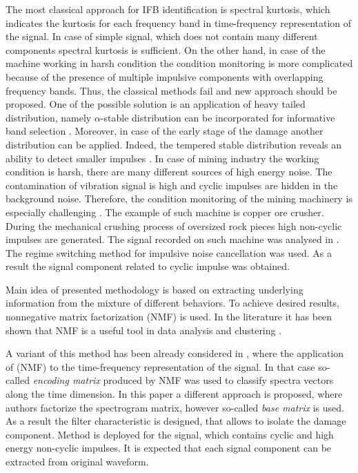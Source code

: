 \documentclass[journal]{IEEEtran}
\begin{document}
The most classical approach for IFB identification is spectral kurtosis, which indicates the kurtosis for each frequency band in time-frequency representation of the signal. In case of simple signal, which does not contain many different components spectral kurtosis is sufficient. On the other hand, in case of the machine working in harsh condition the condition monitoring is more complicated because of the presence of multiple impulsive components with overlapping frequency bands. Thus, the classical methods fail and new approach should be proposed. One of the possible solution is an application of heavy tailed distribution, namely $\alpha$-stable distribution can be incorporated for informative band selection \cite{zak2016data}. Moreover, in case of the early stage of the damage another distribution can be applied. Indeed, the tempered stable distribution reveals an ability to detect smaller impulses \cite{wylomanska2016application}. In case of mining industry the working condition is harsh, there are many different sources of high energy noise. The contamination of vibration signal is high and cyclic impulses are hidden in the background noise. Therefore, the condition monitoring of the mining machinery is especially challenging \cite{bartelmus2014object}. The example of such machine is copper ore crusher. During the mechanical crushing process of oversized rock pieces high non-cyclic impulses are generated. The signal recorded on such machine was analysed in \cite{wylomanskaimpulsive}. The regime switching method for impulsive noise cancellation was used. As a result the signal component related to cyclic impulse was obtained.

Main idea of presented methodology is based on extracting underlying information from the mixture of different behaviors. To achieve desired results, nonnegative matrix factorization (NMF) is used. In the literature it has been shown that NMF is a useful tool in data analysis and clustering \cite{cichocki2009nonnegative, zdunek2008data, wang2013nonnegative, lee1999learning, lee2001algorithms, he2011symmetric}.

A variant of this method has been already considered in \cite{wodecki2017local}, where the application of (NMF) to the time-frequency representation of the signal. In that case so-called \emph{encoding matrix} produced by NMF was used to classify spectra vectors along the time dimension. In this paper a different approach is proposed, where authors factorize the spectrogram matrix, however so-called \emph{base matrix} is used. As a result the filter characteristic is designed, that allows to isolate the damage component. Method is deployed for the signal, which contains cyclic and high energy non-cyclic impulses. It is expected that each signal component can be extracted from original waveform.
\end{document}
